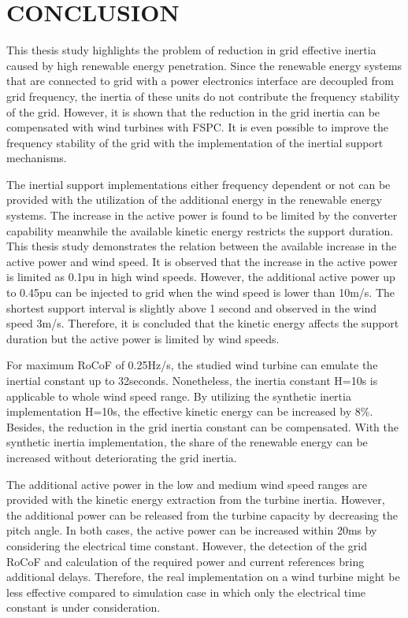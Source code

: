 \chapter{CONCLUSION}
\label{chp:7}
This thesis study highlights the problem of reduction in grid effective inertia caused by high renewable energy penetration. Since the renewable energy systems that are connected to grid with a power electronics interface are decoupled from grid frequency, the inertia of these units do not contribute the frequency stability of the grid. However, it is shown that the reduction in the grid inertia can be compensated with wind turbines with FSPC. It is even possible to improve the frequency stability of the grid with the implementation of the inertial support mechanisms.\par
The inertial support implementations either frequency dependent or not can be provided with the utilization of the additional energy in the renewable energy systems. The increase in the active power is found to be limited by the converter capability meanwhile the available kinetic energy restricts the support duration. This thesis study demonstrates the relation between the available increase in the active power and wind speed. It is observed that the increase in the active power is limited as 0.1pu in high wind speeds. However, the additional active power up to 0.45pu can be injected to grid when the wind speed is lower than 10m/s. The shortest support interval is slightly above 1 second and observed in the wind speed 3m/s. Therefore, it is concluded that the kinetic energy affects the support duration but the active power is limited by wind speeds.\par
For maximum RoCoF of 0.25Hz/s, the studied wind turbine can emulate the inertial constant up to 32seconds. Nonetheless, the inertia constant H=10s is applicable to whole wind speed range. By utilizing the synthetic inertia implementation H=10s, the effective kinetic energy can be increased by 8\%. Besides, the reduction in the grid inertia constant can be compensated. With the synthetic inertia implementation, the share of the renewable energy can be increased without deteriorating the grid inertia.\par
The additional active power in the low and medium wind speed ranges are provided with the kinetic energy extraction from the turbine inertia. However, the additional power can be released from the turbine capacity by decreasing the pitch angle. In both cases, the active power can be increased within 20ms by considering the electrical time constant. However, the detection of the grid RoCoF and calculation of the required power and current references bring additional delays. Therefore, the real implementation on a wind turbine might be less effective compared to simulation case in which only the electrical time constant is under consideration.\par
